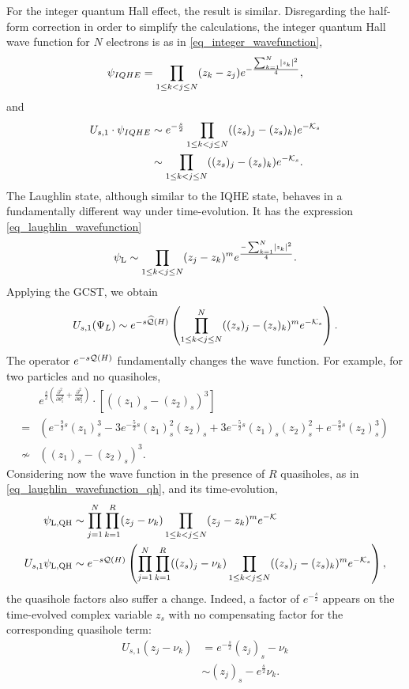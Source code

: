 \documentclass[notas.tex]{subfiles}
\begin{document}
For the integer quantum Hall effect, the result is similar. Disregarding the half-form correction in order to simplify the calculations, the integer quantum Hall wave function for $N$ electrons is as in \eqref{eq_integer_wavefunction},
\begin{align} \label{eq_plane_iqh_evolution}
	\psi_{IQHE} = \prod_{1 \leq k<j \leq N}(z_k - z_j) e^{-\frac{\sum_{k=1}^N \left|z_k\right|^2}{4}},
\end{align}
and
\begin{align*}
	U_{s,1} \cdot \psi_{IQHE} &\sim e^{-\frac{s}{2}} \prod_{1 \leq k<j \leq N}((z_s)_j - (z_s)_k) e^{-\mathcal{K}_s} \\
	&\sim \prod_{1 \leq k<j \leq N}((z_s)_j - (z_s)_k) e^{-\mathcal{K}_s}.
\end{align*}
The Laughlin state, although similar to the IQHE state, behaves in a fundamentally different way under time-evolution. It has the expression \eqref{eq_laughlin_wavefunction}
\begin{align*}
	\psi_\text{L} \sim \prod_{1 \leq k < j \leq N}(z_j - z_k)^m e^{\frac{-\sum_{k=1}^N \left|z_k\right|^2}{4}}.
\end{align*}
Applying the GCST, we obtain
\begin{align*} U_{s,1}(\Psi_{L}) \sim e^{-s\widehat{\mathcal{Q}}(H)} \left ( \prod_{1 \leq k < j \leq N}^N((z_{s})_j - (z_{s})_k)^m e^{-\mathcal{K}_s}\right ).
\end{align*}
The operator $e^{-s\mathcal{Q}(H)}$ fundamentally changes the wave function. For example, for two particles and no quasiholes,
\begin{align}
&e^{\frac{s}{2}\left (\frac{\partial^2}{\partial \theta_1^2} + \frac{\partial^2}{\partial \theta_2^2} \right )} \cdot \left [ ((z_1)_{s} - (z_2)_{s})^3 \right ] \nonumber \\
=& \left ( e^{-\frac{9}{2}s} (z_1)_{s}^3 - 3 e^{-\frac{5}{2}s} (z_1)^2_{s}(z_2)_{s} +  3 e^{-\frac{5}{2}s} (z_1)_{s}(z_2)^2_{s} + e^{-\frac{9}{2}s} (z_2)_{s}^3\right ) \label{eq_prefactor_change_plane} \\
\not\sim& ((z_1)_{s} - (z_2)_{s})^3. \nonumber
\end{align}
Considering now the wave function in the presence of $R$ quasiholes, as in \eqref{eq_laughlin_wavefunction_qh}, and its time-evolution,
\begin{align*}
	\psi_\text{L,QH} &\sim \prod_{j = 1}^{N}\prod_{k = 1}^{R}(z_j - \nu_k) \prod_{1 \leq k < j \leq N}(z_j - z_k)^m e^{-\mathcal{K}} \\
	U_{s,1} \psi_\text{L,QH} &\sim e^{-s\mathcal{Q}(H)} \left ( \prod_{j = 1}^{N}\prod_{k = 1}^{R}((z_{s})_j - \nu_k) \prod_{1 \leq k < j \leq N}((z_{s})_j - (z_{s})_k)^m e^{-\mathcal{K}_s}\right ),
\end{align*}
the quasihole factors also suffer a change. Indeed, a factor of $e^{-\frac{s}{2}}$ appears on the time-evolved complex variable $z_{s}$ with no compensating factor for the corresponding quasihole term:
\begin{align} \label{eq_qh_change}
U_{s,1}(z_j - \nu_k) &= e^{-\frac{s}{2}}(z_j)_{s} - \nu_k \\
&\sim (z_j)_{s} - e^{\frac{s}{2}}\nu_k .\nonumber
\end{align}
\end{document}
